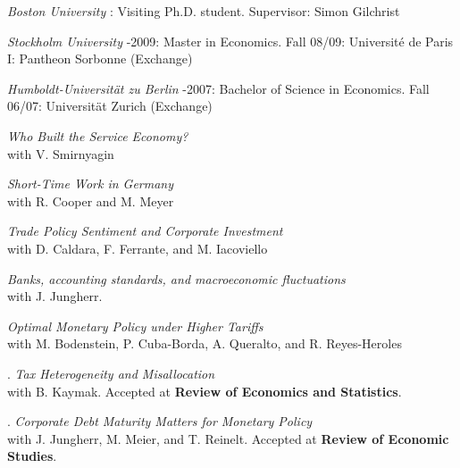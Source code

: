 \documentclass[11pt]{article}
\begin{document}
\medskip
\noindent\emph{Boston University\vspace{0.02in}}
: Visiting Ph.D. student. Supervisor: Simon Gilchrist

\smallskip
\noindent\emph{Stockholm University\vspace{0.02in}}
-2009: Master in Economics. \newline Fall 08/09: Université de Paris I: Pantheon Sorbonne (Exchange)   \vspace{0.01in}

\smallskip
\noindent\emph{Humboldt-Universität zu Berlin\vspace{0.02in}}
-2007: Bachelor of Science in Economics. \newline Fall 06/07: Universität Zurich (Exchange)  \vspace{0.01in}

\newpage

\ind\emph{Who Built the Service Economy?} \\ \ind with V. Smirnyagin

\smallskip
\ind \emph{Short-Time Work in Germany} \\ \ind with R. Cooper and M. Meyer

\smallskip
\ind\emph{Trade Policy Sentiment and Corporate Investment} \\ \ind with D. Caldara, F. Ferrante, and M. Iacoviello


\ind \emph{Banks, accounting standards, and macroeconomic fluctuations} \\ \ind with J. Jungherr.

\smallskip
\ind\emph{Optimal Monetary Policy under Higher Tariffs} \\ \ind with M. Bodenstein, P. Cuba-Borda, A. Queralto, and R. Reyes-Heroles



. \emph{Tax Heterogeneity and Misallocation} \\ \ind with B. Kaymak. Accepted at \textbf{Review of Economics and Statistics}.


. \emph{Corporate Debt Maturity Matters for Monetary Policy} \\ \ind with J. Jungherr, M. Meier, and T. Reinelt. Accepted at \textbf{Review of Economic Studies}.
\end{document}
